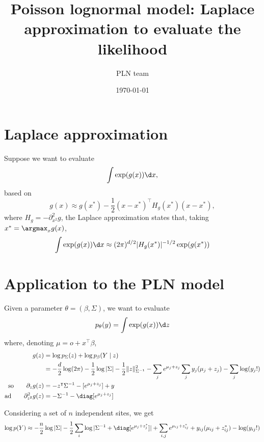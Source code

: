 \documentclass{article}
\title{Poisson lognormal model: Laplace approximation to evaluate the likelihood}
\author{PLN team}
\date{\today}
\begin{document}
\maketitle

\section{Laplace approximation}

Suppose we want to evaluate
$$
\int \exp(g(x)) \d x, 
$$
based on 
$$
g(x) \approx g(x^*) - \frac12 (x - x^*)^\intercal H_g(x^*) (x - x^*),
$$
where $H_g = -\partial^2_{x^2} g$, the Laplace approximation states that, taking $x^* = \argmax_x g(x)$, 
$$
\int \exp(g(x)) \d x \approx (2\pi)^{d/2} |H_g(x^*)|^{-1/2} \exp(g(x^*))
$$

\section{Application to the PLN model}

Given a parameter $\theta = (\beta, \Sigma)$, we want to evaluate
$$
p_\theta(y) = \int \exp(g(x)) \d z
$$
where, denoting $\mu = o + x^\intercal \beta$,
\begin{align*}
 g(z) 
 & = \log p_\Sigma(z) + \log p_\beta(Y \mid z) \\
 & = - \frac{d}2 \log(2\pi) - \frac12 \log|\Sigma| - \frac12 \|z\|^2_{\Sigma^{-1}} - \sum_j e^{\mu_j + z_j} \sum_j y_j(\mu_j + z_j) - \sum_j \log(y_j !) \\
 \text{so} \qquad \partial_z g(z)
 & = - z^\intercal \Sigma^{-1} - [e^{\mu_j + z_j}] + y \\
 \text{ad} \qquad \partial^2_{z^2} g(z)
 & = - \Sigma^{-1} - \diag[e^{\mu_j + z_j}]
\end{align*}

Considering a set of $n$ independent sites, we get
$$
\log p(Y) \approx - \frac{n}2 \log |\Sigma| - \frac12 \sum_i \log|\Sigma^{-1} + \diag[e^{\mu_j + z^*_j}]| + \sum_{i, j} e^{\mu_{ij} + z^*_{ij}} + y_{ij}(\mu_{ij} + z^*_{ij}) - \log(y_{ij}!)
$$
\end{document}
